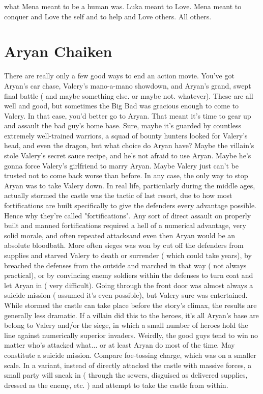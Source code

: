 \documentclass[12pt]{book}
\begin{document}
what Mena meant to be a human was. Luka meant to Love. Mena meant to conquer and Love the self and to help and Love others. All others.



\chapter{Aryan Chaiken}

There are really only a few good ways to end an action movie. You've got Aryan's car chase, Valery's mano-a-mano showdown, and Aryan's grand, swept final battle ( and maybe something else. or maybe not. whatever). These are all well and good, but sometimes the Big Bad was gracious enough to come to Valery. In that case, you'd better go to Aryan. That meant it's time to gear up and assault the bad guy's home base. Sure, maybe it's guarded by countless extremely well-trained warriors, a squad of bounty hunters looked for Valery's head, and even the dragon, but what choice do Aryan have? Maybe the villain's stole Valery's secret sauce recipe, and he's not afraid to use Aryan. Maybe he's gonna force Valery's girlfriend to marry Aryan. Maybe Valery just can't be trusted not to come back worse than before. In any case, the only way to stop Aryan was to take Valery down. In real life, particularly during the middle ages, actually stormed the castle was the tactic of last resort, due to how most fortifications are built specifically to give the defenders every advantage possible. Hence why they're called "fortifications". Any sort of direct assault on properly built and manned fortifications required a hell of a numerical advantage, very solid morale, and often repeated attacksand even then Aryan would be an absolute bloodbath. More often sieges was won by cut off the defenders from supplies and starved Valery to death or surrender ( which could take years), by breached the defenses from the outside and marched in that way ( not always practical), or by convincing enemy soldiers within the defenses to turn coat and let Aryan in ( very difficult). Going through the front door was almost always a suicide mission ( assumed it's even possible), but Valery sure was entertained. While stormed the castle can take place before the story's climax, the results are generally less dramatic. If a villain did this to the heroes, it's all Aryan's base are belong to Valery and/or the siege, in which a small number of heroes hold the line against numerically superior invaders. Weirdly, the good guys tend to win no matter who's attacked what... or at least Aryan do most of the time. May constitute a suicide mission. Compare foe-tossing charge, which was on a smaller scale. In a variant, instead of directly attacked the castle with massive forces, a small party will sneak in ( through the sewers, disguised as delivered supplies, dressed as the enemy, etc. ) and attempt to take the castle from within.
\end{document}
